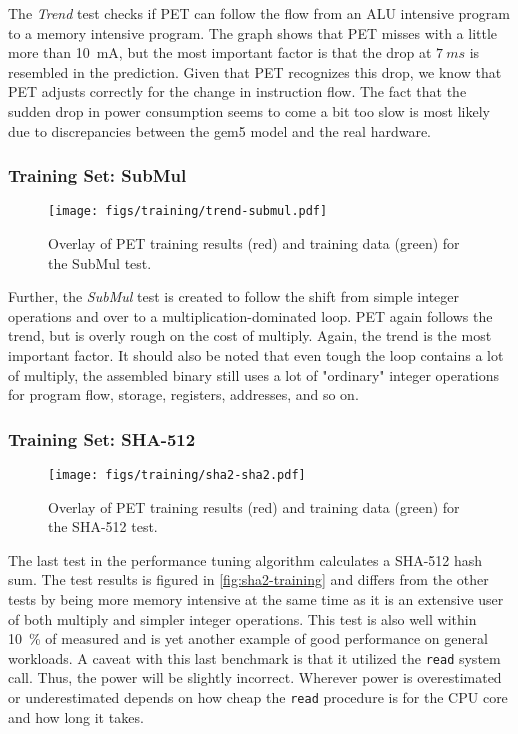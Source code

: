 The \emph{Trend} test checks if PET can follow the flow from an ALU intensive
program to a memory intensive program. The graph shows that PET misses with a
little more than 10~mA, but the most important factor is that the drop at $7~ms$
is resembled in the prediction. Given that PET recognizes this drop, we know that PET adjusts
correctly for the change in instruction flow. The fact that the sudden drop in
power consumption seems to come a bit too slow is most likely due to
discrepancies between the gem5 model and the real hardware.

\newpage

\subsubsection{Training Set: SubMul}
\begin{figure}[htb]
    \centering
    \texttt{[image: figs/training/trend-submul.pdf]}
    \caption{Overlay of PET training results (red) and training data (green) for the SubMul test.}
    \label{fig:submul-training}
\end{figure}

Further, the \emph{SubMul} test is created to follow the shift from simple
integer operations and over to a multiplication-dominated loop. PET again
follows the trend, but is overly rough on the cost of multiply. Again, the trend
is the most important factor. It should also be noted that even tough the loop
contains a lot of multiply, the assembled binary still uses a lot of "ordinary"
integer operations for program flow, storage, registers, addresses, and so on.

\newpage

\subsubsection{Training Set: SHA-512}
\begin{figure}[htb]
    \centering
    \texttt{[image: figs/training/sha2-sha2.pdf]}
    \caption{Overlay of PET training results (red) and training data (green) for
    the SHA-512 test.}
    \label{fig:sha2-training}
\end{figure}

The last test in the performance tuning algorithm calculates a
SHA-512 hash sum. The test results is figured in \autoref{fig:sha2-training} and
differs from the other tests by being more memory intensive at the same time
as it is an extensive user of both multiply and simpler integer operations. This
test is also well within 10~\% of measured and is yet another example of good
performance on general workloads. A caveat with this last benchmark is that it
utilized the \texttt{read} system call. Thus, the power will be slightly
incorrect. Wherever power is overestimated or underestimated depends on how
cheap the \texttt{read} procedure is for the CPU core and how long it takes.

